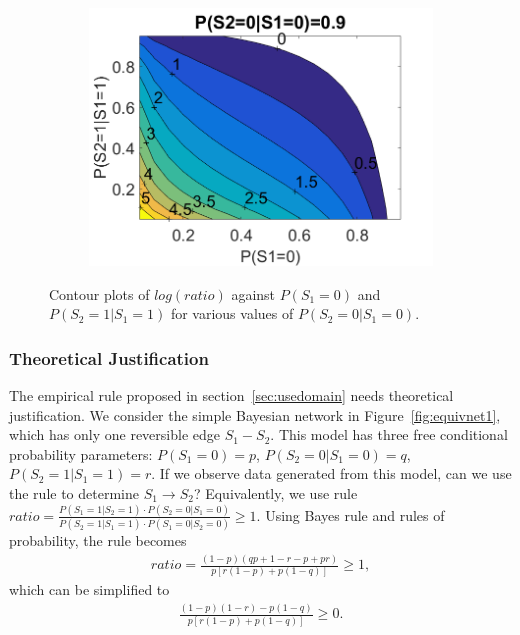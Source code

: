 \documentclass{edm_template}
\begin{document}
\begin{figure}[!ht]
\begin{subfigure}[t]{0.32\linewidth}
				\includegraphics[width=1.05\linewidth]{figures/contour3.png}
				\caption{\label{fig:contour3}}
			\end{subfigure}						
			\caption{Contour plots of $log(ratio)$ against $P(S_1=0)$ and $P(S_2=1|S_1=1)$ for various values of $P(S_2=0|S_1=0)$.\label{fig:contours} }
		\end{figure}

\subsubsection{Theoretical Justification}
\label{sec:theory}

The empirical rule proposed in section~\ref{sec:usedomain} needs theoretical justification.
We consider the simple Bayesian network in Figure~\ref{fig:equivnet1}, which has only one reversible edge $S_1-S_2$.
This model has three free conditional probability parameters: $P(S_1=0)=p$, $P(S_2=0|S_1=0)=q$, $P(S_2=1|S_1=1)=r$.
If we observe data generated from this model, 
can we use the rule to determine $S_1\rightarrow S_2$? %
Equivalently, we use rule $ratio=\frac{P(S_1=1|S_2=1)\cdot P(S_2=0|S_1=0)}{P(S_2=1|S_1=1)\cdot P(S_1=0|S_2=0)}\ge 1$.
Using Bayes rule and rules of probability, the rule becomes
\begin{align}
ratio=\frac{(1-p)(qp+1-r-p+pr)}{p[r(1-p)+p(1-q)]}\ge 1,
\end{align}
which can be simplified to
\begin{align}
\frac{(1-p)(1-r)-p(1-q)}{p[r(1-p)+p(1-q)]}\ge 0.
\end{align}
\end{document}
